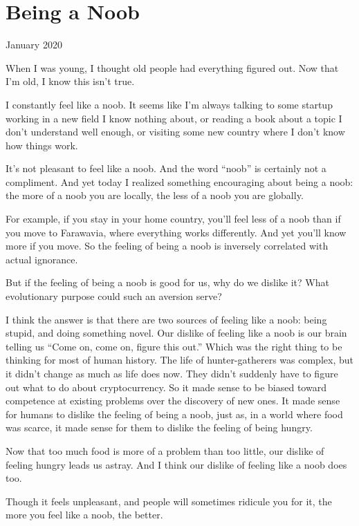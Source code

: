 \chapter{Being a Noob}

January 2020

When I was young, I thought old people had everything figured out. Now
that I'm old, I know this isn't true.

I constantly feel like a noob. It seems like I'm always talking to some
startup working in a new field I know nothing about, or reading a book
about a topic I don't understand well enough, or visiting some new
country where I don't know how things work.

It's not pleasant to feel like a noob. And the word ``noob'' is
certainly not a compliment. And yet today I realized something
encouraging about being a noob: the more of a noob you are locally, the
less of a noob you are globally.

For example, if you stay in your home country, you'll feel less of a
noob than if you move to Farawavia, where everything works differently.
And yet you'll know more if you move. So the feeling of being a noob is
inversely correlated with actual ignorance.

But if the feeling of being a noob is good for us, why do we dislike it?
What evolutionary purpose could such an aversion serve?

I think the answer is that there are two sources of feeling like a noob:
being stupid, and doing something novel. Our dislike of feeling like a
noob is our brain telling us ``Come on, come on, figure this out.''
Which was the right thing to be thinking for most of human history. The
life of hunter-gatherers was complex, but it didn't change as much as
life does now. They didn't suddenly have to figure out what to do about
cryptocurrency. So it made sense to be biased toward competence at
existing problems over the discovery of new ones. It made sense for
humans to dislike the feeling of being a noob, just as, in a world where
food was scarce, it made sense for them to dislike the feeling of being
hungry.

Now that too much food is more of a problem than too little, our dislike
of feeling hungry leads us astray. And I think our dislike of feeling
like a noob does too.

Though it feels unpleasant, and people will sometimes ridicule you for
it, the more you feel like a noob, the better.